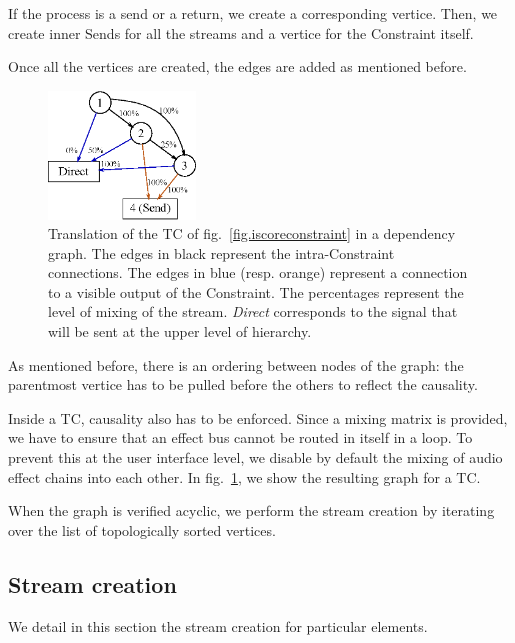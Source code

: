 \documentclass{article}
\newcommand*{\timeconstraint}{\ac{TC}\xspace}
\begin{document}
If the process is a send or a return, we create a corresponding vertice.
Then, we create inner Sends for all the streams and a vertice for the Constraint itself.

Once all the vertices are created, the edges are added as mentioned before.

\begin{figure}
	\centering
	\includegraphics[width=0.35\textwidth]{figures/graph1.eps}
	\caption{Translation of the \timeconstraint of fig.~\ref{fig.iscoreconstraint} in a dependency graph.
		The edges in black represent the intra-Constraint connections. 
		The edges in blue (resp. orange) represent a connection to a visible output of 
		the Constraint. The percentages represent the level of mixing of the stream.
		\textit{Direct} corresponds to the signal that will be sent at the upper level of hierarchy.}
	\label{fig.graph}
\end{figure}

As mentioned before, there is an ordering between nodes of the graph: the parentmost vertice
has to be pulled before the others to reflect the causality.


Inside a \timeconstraint, causality also has to be enforced. 
Since a mixing matrix is provided, we have to ensure that an effect bus cannot be routed in 
itself in a loop. 
To prevent this at the user interface level, we disable by default the mixing of audio effect chains into each other. In fig.~\ref{fig.graph}, we show the resulting graph for a \timeconstraint. 

When the graph is verified acyclic, we perform the stream creation by iterating over the list of topologically sorted vertices.

\subsection{Stream creation}
We detail in this section the stream creation for particular elements.
\end{document}
